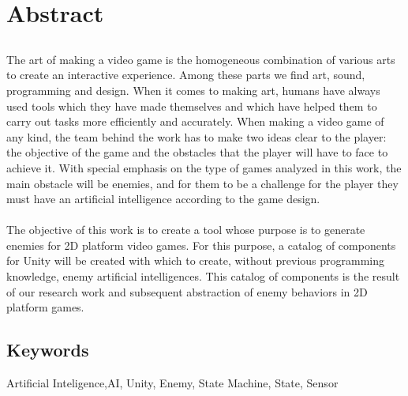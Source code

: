\chapter*{Abstract}

\section*{\tituloPortadaEngVal}


The art of making a video game is the homogeneous combination of various arts to create an interactive experience. Among these parts we find art, sound, programming and design. When it comes to making art, humans have always used tools which they have made themselves and which have helped them to carry out tasks more efficiently and accurately.
When making a video game of any kind, the team behind the work has to make two ideas clear to the player: the objective of the game and the obstacles that the player will have to face to achieve it. With special emphasis on the type of games analyzed in this work, the main obstacle will be enemies, and for them to be a challenge for the player they must have an artificial intelligence according to the game design. \\\\ 

The objective of this work is to create a tool whose purpose is to generate enemies for 2D platform video games. For this purpose, a catalog of components for Unity will be created with which to create, without previous programming knowledge, enemy artificial intelligences. This catalog of components is the result of our research work and subsequent abstraction of enemy behaviors in 2D platform games. 

\section*{Keywords}

\noindent  Artificial Inteligence,AI, Unity, Enemy, State Machine, State, Sensor



